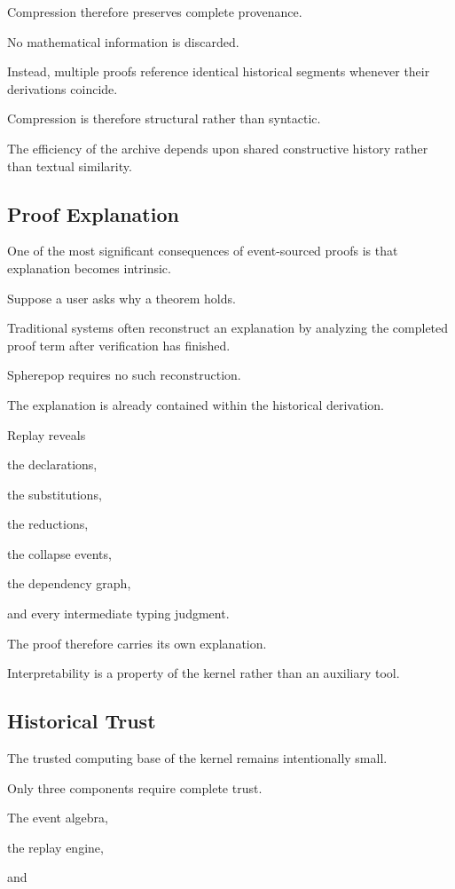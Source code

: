 \documentclass[12pt,oneside]{article}
\theoremstyle{definition}
\theoremstyle{remark}
\begin{document}
Compression therefore preserves complete provenance.

No mathematical information is discarded.

Instead, multiple proofs reference identical historical segments whenever their
derivations coincide.

Compression is therefore structural rather than syntactic.

The efficiency of the archive depends upon shared constructive history rather
than textual similarity.

\subsection{Proof Explanation}

One of the most significant consequences of event-sourced proofs is that
explanation becomes intrinsic.

Suppose a user asks why a theorem holds.

Traditional systems often reconstruct an explanation by analyzing the completed
proof term after verification has finished.

Spherepop requires no such reconstruction.

The explanation is already contained within the historical derivation.

Replay reveals

the declarations,

the substitutions,

the reductions,

the collapse events,

the dependency graph,

and every intermediate typing judgment.

The proof therefore carries its own explanation.

Interpretability is a property of the kernel rather than an auxiliary tool.

\subsection{Historical Trust}

The trusted computing base of the kernel remains intentionally small.

Only three components require complete trust.

The event algebra,

the replay engine,

and
\end{document}
